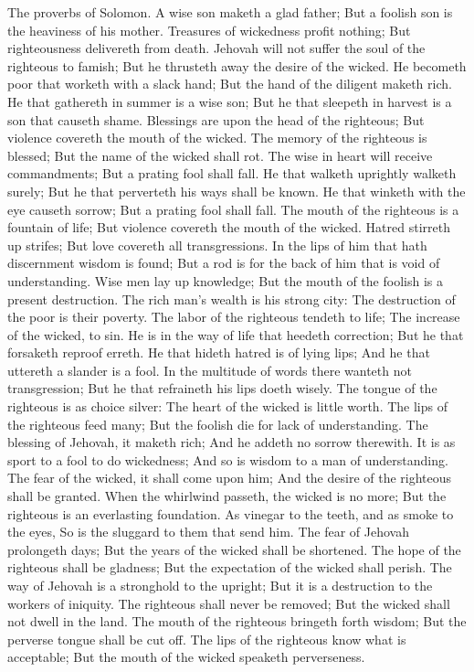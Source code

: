 The proverbs of Solomon. A wise son maketh a glad father; But a foolish son is the heaviness of his mother.  Treasures of wickedness profit nothing; But righteousness delivereth from death.  Jehovah will not suffer the soul of the righteous to famish; But he thrusteth away the desire of the wicked.  He becometh poor that worketh with a slack hand; But the hand of the diligent maketh rich.  He that gathereth in summer is a wise son; But he that sleepeth in harvest is a son that causeth shame.  Blessings are upon the head of the righteous; But violence covereth the mouth of the wicked.  The memory of the righteous is blessed; But the name of the wicked shall rot.  The wise in heart will receive commandments; But a prating fool shall fall.  He that walketh uprightly walketh surely; But he that perverteth his ways shall be known.  He that winketh with the eye causeth sorrow; But a prating fool shall fall.  The mouth of the righteous is a fountain of life; But violence covereth the mouth of the wicked.  Hatred stirreth up strifes; But love covereth all transgressions.  In the lips of him that hath discernment wisdom is found; But a rod is for the back of him that is void of understanding.  Wise men lay up knowledge; But the mouth of the foolish is a present destruction.  The rich man’s wealth is his strong city: The destruction of the poor is their poverty.  The labor of the righteous tendeth to life; The increase of the wicked, to sin.  He is in the way of life that heedeth correction; But he that forsaketh reproof erreth.  He that hideth hatred is of lying lips; And he that uttereth a slander is a fool.  In the multitude of words there wanteth not transgression; But he that refraineth his lips doeth wisely.  The tongue of the righteous is as choice silver: The heart of the wicked is little worth.  The lips of the righteous feed many; But the foolish die for lack of understanding.  The blessing of Jehovah, it maketh rich; And he addeth no sorrow therewith.  It is as sport to a fool to do wickedness; And so is wisdom to a man of understanding.  The fear of the wicked, it shall come upon him; And the desire of the righteous shall be granted.  When the whirlwind passeth, the wicked is no more; But the righteous is an everlasting foundation.  As vinegar to the teeth, and as smoke to the eyes, So is the sluggard to them that send him.  The fear of Jehovah prolongeth days; But the years of the wicked shall be shortened.  The hope of the righteous shall be gladness; But the expectation of the wicked shall perish.  The way of Jehovah is a stronghold to the upright; But it is a destruction to the workers of iniquity.  The righteous shall never be removed; But the wicked shall not dwell in the land.  The mouth of the righteous bringeth forth wisdom; But the perverse tongue shall be cut off.  The lips of the righteous know what is acceptable; But the mouth of the wicked speaketh perverseness. 

